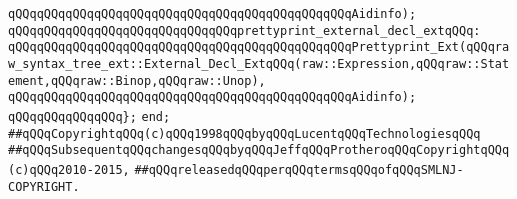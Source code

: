 \verb|qQQqqQQqqQQqqQQqqQQqqQQqqQQqqQQqqQQqqQQqqQQqqQQqAidinfo);|\newline
\newline
\verb|qQQqqQQqqQQqqQQqqQQqqQQqqQQqqQQqprettyprint_external_decl_extqQQq:|\newline
\verb|qQQqqQQqqQQqqQQqqQQqqQQqqQQqqQQqqQQqqQQqqQQqqQQqPrettyprint_Ext(qQQqraw_syntax_tree_ext::External_Decl_ExtqQQq(raw::Expression,qQQqraw::Statement,qQQqraw::Binop,qQQqraw::Unop),|\newline
\verb|qQQqqQQqqQQqqQQqqQQqqQQqqQQqqQQqqQQqqQQqqQQqqQQqAidinfo);|\newline
\verb|qQQqqQQqqQQqqQQq};|\newline
\newline
\verb|end;|\newline
\newline
\newline
\verb|##qQQqCopyrightqQQq(c)qQQq1998qQQqbyqQQqLucentqQQqTechnologiesqQQq|\newline
\verb|##qQQqSubsequentqQQqchangesqQQqbyqQQqJeffqQQqProtheroqQQqCopyrightqQQq(c)qQQq2010-2015,|\newline
\verb|##qQQqreleasedqQQqperqQQqtermsqQQqofqQQqSMLNJ-COPYRIGHT.|\newline

